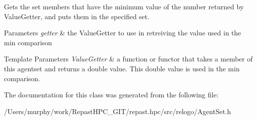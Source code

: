 Gets the set members that have the minimum value of the number returned by Value\-Getter, and puts them in the specified set. 


\begin{DoxyParams}{Parameters}
{\em getter} & the Value\-Getter to use in retreiving the value used in the min comparison\\
\hline
\end{DoxyParams}

\begin{DoxyTemplParams}{Template Parameters}
{\em Value\-Getter} & a function or functor that takes a member of this agentset and returns a double value. This double value is used in the min comparison. \\
\hline
\end{DoxyTemplParams}


The documentation for this class was generated from the following file\-:\begin{DoxyCompactItemize}
\item 
/\-Users/murphy/work/\-Repast\-H\-P\-C\-\_\-\-G\-I\-T/repast.\-hpc/src/relogo/Agent\-Set.\-h\end{DoxyCompactItemize}
